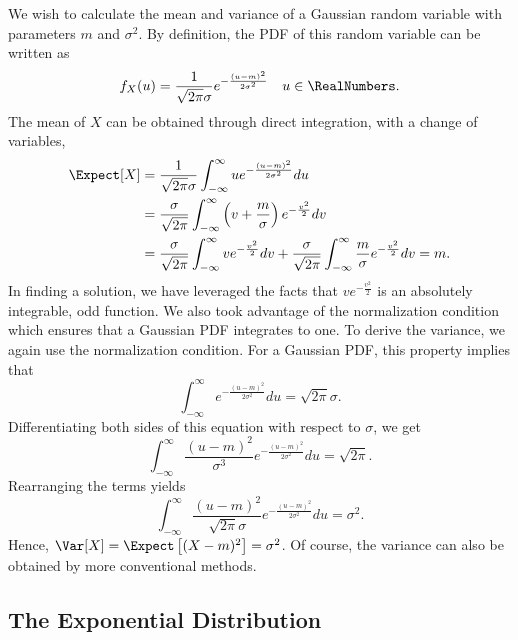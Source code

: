\begin{example}
We wish to calculate the mean and variance of a Gaussian random variable with parameters $m$ and $\sigma^2$.
By definition, the PDF of this random variable can be written as
\begin{equation*}
f_X (u) = \frac{1}{\sqrt{2 \pi} \sigma} e^{-\frac{(u - m)^2}{2\sigma^2}}
\quad u \in \RealNumbers .
\end{equation*}
The mean of $X$ can be obtained through direct integration, with a change of variables,
\begin{equation*}
\begin{split}
\Expect [X]
&= \frac{1}{\sqrt{2 \pi} \sigma} \int_{- \infty}^{\infty} u e^{-\frac{(u-m)^2}{2\sigma^2}} du \\
&= \frac{\sigma}{\sqrt{2 \pi}} \int_{- \infty}^{\infty}
\left( v+\frac{m}{\sigma} \right) e^{-\frac{v^2}{2}} dv \\
&= \frac{\sigma}{\sqrt{2 \pi}} \int_{- \infty}^{\infty}
v e^{-\frac{v^2}{2}} dv
+ \frac{\sigma}{\sqrt{2 \pi}} \int_{- \infty}^{\infty}
\frac{m}{\sigma} e^{-\frac{v^2}{2}} dv
= m.
\end{split}
\end{equation*}
In finding a solution, we have leveraged the facts that $v e^{-\frac{v^2}{2}}$ is an absolutely integrable, odd function.
We also took advantage of the normalization condition which ensures that a Gaussian PDF integrates to one.
To derive the variance, we again use the normalization condition.
For a Gaussian PDF, this property implies that
\begin{equation*}
\int_{-\infty}^{\infty} e^{- \frac{(u-m)^2}{2 \sigma^2}} du
= \sqrt{2 \pi} \sigma .
\end{equation*}
Differentiating both sides of this equation with respect to $\sigma$, we get
\begin{equation*}
\int_{-\infty}^{\infty} \frac{(u-m)^2}{\sigma^3}
e^{- \frac{(u-m)^2}{2 \sigma^2}} du
= \sqrt{2 \pi} .
\end{equation*}
Rearranging the terms yields
\begin{equation*}
\int_{-\infty}^{\infty} \frac{(u-m)^2}{\sqrt{2 \pi} \sigma}
e^{- \frac{(u-m)^2}{2 \sigma^2}} du
= \sigma^2 .
\end{equation*}
Hence, $\Var[X] = \Expect \left[ (X-m)^2 \right] = \sigma^2$.
Of course, the variance can also be obtained by more conventional methods.
\end{example}

\subsection{The Exponential Distribution}
\label{section:ExponentialDistribution}

